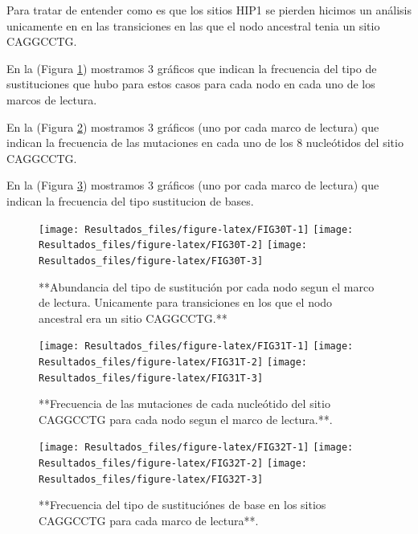 \documentclass[
]{book}
\begin{document}
Para tratar de entender como es que los sitios HIP1 se pierden hicimos un análisis unicamente en en las transiciones en las que el nodo ancestral tenia un sitio CAGGCCTG.

En la (Figura \ref{fig:FIG30T}) mostramos 3 gráficos que indican la frecuencia del tipo de sustituciones que hubo para estos casos para cada nodo en cada uno de los marcos de lectura.

En la (Figura \ref{fig:FIG31T}) mostramos 3 gráficos (uno por cada marco de lectura) que indican la frecuencia de las mutaciones en cada uno de los 8 nucleótidos del sitio CAGGCCTG.

En la (Figura \ref{fig:FIG32T}) mostramos 3 gráficos (uno por cada marco de lectura) que indican la frecuencia del tipo sustitucion de bases.

\begin{figure}

{\centering \texttt{[image: Resultados\_files/figure-latex/FIG30T-1]} \texttt{[image: Resultados\_files/figure-latex/FIG30T-2]} \texttt{[image: Resultados\_files/figure-latex/FIG30T-3]} 

}

\caption{**Abundancia del tipo de sustitución por cada nodo segun el marco de lectura. Unicamente para transiciones en los que el nodo ancestral era un sitio CAGGCCTG.**}\label{fig:FIG30T}
\end{figure}

\begin{figure}

{\centering \texttt{[image: Resultados\_files/figure-latex/FIG31T-1]} \texttt{[image: Resultados\_files/figure-latex/FIG31T-2]} \texttt{[image: Resultados\_files/figure-latex/FIG31T-3]} 

}

\caption{**Frecuencia de las mutaciones de cada nucleótido del sitio CAGGCCTG para cada nodo segun el marco de lectura.**.}\label{fig:FIG31T}
\end{figure}

\begin{figure}

{\centering \texttt{[image: Resultados\_files/figure-latex/FIG32T-1]} \texttt{[image: Resultados\_files/figure-latex/FIG32T-2]} \texttt{[image: Resultados\_files/figure-latex/FIG32T-3]} 

}

\caption{**Frecuencia del tipo de sustituciónes de base en los sitios CAGGCCTG para cada marco de lectura**.}\label{fig:FIG32T}
\end{figure}
\end{document}

